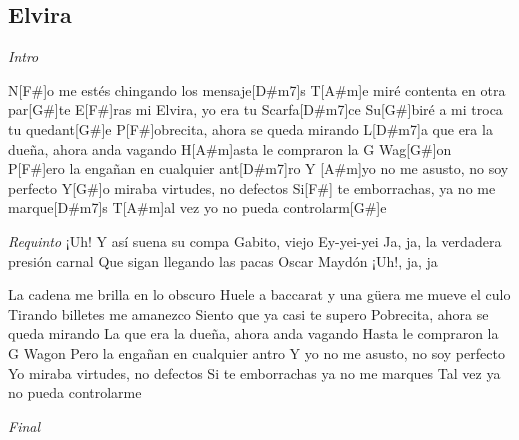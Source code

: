 \subsection{Elvira}
\noindent

\vspace{1cm}

\begin{guitar}
	\begin{multicols}{2}

		\textit{Intro}

		N[F#]o me estés chingando los mensaje[D#m7]s
		T[A#m]e miré contenta en otra par[G#]te
		E[F#]ras mi Elvira, yo era tu Scarfa[D#m7]ce
		Su[G#]biré a mi troca tu quedant[G#]e
		P[F#]obrecita, ahora se queda mirando
		L[D#m7]a que era la dueña, ahora anda vagando
		H[A#m]asta le compraron la G Wag[G#]on
		P[F#]ero la engañan en cualquier ant[D#m7]ro
		Y [A#m]yo no me asusto, no soy perfecto
		Y[G#]o miraba virtudes, no defectos
		Si[F#] te emborrachas, ya no me marque[D#m7]s
		T[A#m]al vez yo no pueda controlarm[G#]e

	\par
	\textit{Requinto}
	¡Uh!
	Y así suena su compa Gabito, viejo
	Ey-yei-yei
	Ja, ja, la verdadera presión carnal
	Que sigan llegando las pacas
	Oscar Maydón
	¡Uh!, ja, ja

	\par
	La cadena me brilla en lo obscuro
	Huele a baccarat y una güera me mueve el culo
	Tirando billetes me amanezco
	Siento que ya casi te supero
	Pobrecita, ahora se queda mirando
	La que era la dueña, ahora anda vagando
	Hasta le compraron la G Wagon
	Pero la engañan en cualquier antro
	Y yo no me asusto, no soy perfecto
	Yo miraba virtudes, no defectos
	Si te emborrachas ya no me marques
	Tal vez ya no pueda controlarme

	\textit{Final}

	\end{multicols}
\end{guitar}
